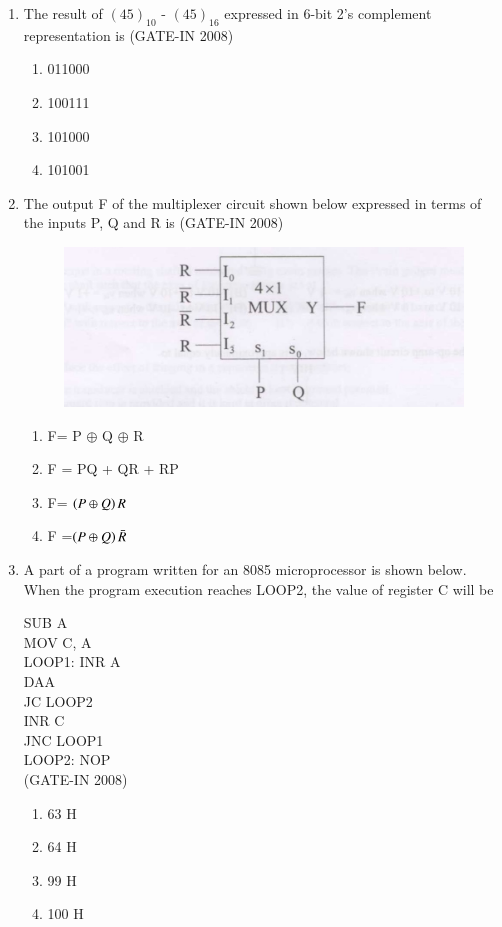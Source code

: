 \documentclass[journal,12pt,onecolumn]{IEEEtran}
\theoremstyle{remark}
\begin{document}
\begin{enumerate}
    \item The result of $(45)_{10}$ - $(45)_{16}$ expressed in 6-bit 2's complement representation is \hfill{(GATE-IN 2008)}
    \begin{multicols}{4}
    \begin{enumerate} 
        \item 011000
        \item 100111
        \item 101000
        \item 101001
    \end{enumerate}
    \end{multicols}
    
    \item  The output F of the multiplexer circuit shown below  expressed in terms of the inputs P, Q and R is \hfill{(GATE-IN 2008)}
    \begin{figure}[H]
    \centering
    \includegraphics[width=0.5\columnwidth]{figs/i23.jpg}
    \caption{}
    \label{fig:placeholder23}
\end{figure}
\begin{multicols}{4}
    \begin{enumerate} 
        \item  F= P $\oplus$ Q $\oplus$ R
        \item  F = PQ + QR + RP
        \item  F= $\left(P \oplus Q\right)R$
        \item  F =$\left(P\oplus Q\right) \bar{R}$
    \end{enumerate}
    \end{multicols}
    
    \item A part of a program written for an 8085 microprocessor is shown below. When the program
execution reaches LOOP2, the value of register C will be

 SUB A\\ 
 MOV C, A  \\
 LOOP1: INR A\\  
    DAA  \\
    JC LOOP2\\  
    INR C  \\
    JNC LOOP1\\  
LOOP2: NOP\\
 \hfill{(GATE-IN 2008)}
 \begin{multicols}{4}
    \begin{enumerate} 
        \item 63 H
        \item 64 H
        \item 99 H
        \item 100 H
    \end{enumerate}
    \end{multicols}
    

\end{enumerate}
\end{document}
